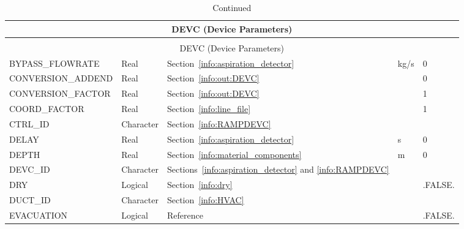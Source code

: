 \documentclass[11pt]{book}
\begin{document}
\begin{longtable}{@{\extracolsep{\fill}}|l|l|l|l|l|}
\caption[Device parameters ({\ct DEVC} namelist group)]{For more information see Section~\ref{info:DEVC}.}
\label{tbl:DEVC} \\
\hline
\multicolumn{5}{|c|}{{\ct DEVC} (Device Parameters)} \\
\hline \hline
\endfirsthead
\caption[]{Continued} \\
\hline
\multicolumn{5}{|c|}{{\ct DEVC} (Device Parameters)} \\
\hline \hline
\endhead
{\ct BYPASS\_FLOWRATE}      & Real            & Section~\ref{info:aspiration_detector}                          & kg/s  & 0             \\ \hline
{\ct CONVERSION\_ADDEND}    & Real            & Section~\ref{info:out:DEVC}                                     &       & 0             \\ \hline
{\ct CONVERSION\_FACTOR}    & Real            & Section~\ref{info:out:DEVC}                                     &       & 1             \\ \hline
{\ct COORD\_FACTOR}         & Real            & Section~\ref{info:line_file}                                    &       & 1             \\ \hline
{\ct CTRL\_ID}              & Character       & Section~\ref{info:RAMPDEVC}                                     &       &               \\ \hline
{\ct DELAY}                 & Real            & Section~\ref{info:aspiration_detector}                          & s     & 0             \\ \hline
{\ct DEPTH}                 & Real            & Section~\ref{info:material_components}                          & m     & 0             \\ \hline
{\ct DEVC\_ID}              & Character       & Sections~\ref{info:aspiration_detector} and \ref{info:RAMPDEVC} &       &               \\ \hline
{\ct DRY}                   & Logical         & Section~\ref{info:dry}                                          &       & {\ct .FALSE.} \\ \hline
{\ct DUCT\_ID}              & Character       & Section~\ref{info:HVAC}                                         &       &               \\ \hline
{\ct EVACUATION}            & Logical         & Reference~\cite{FDS_Evac_Users_Guide}                           &       & {\ct .FALSE.} \\ \hline

\end{longtable}
\end{document}
